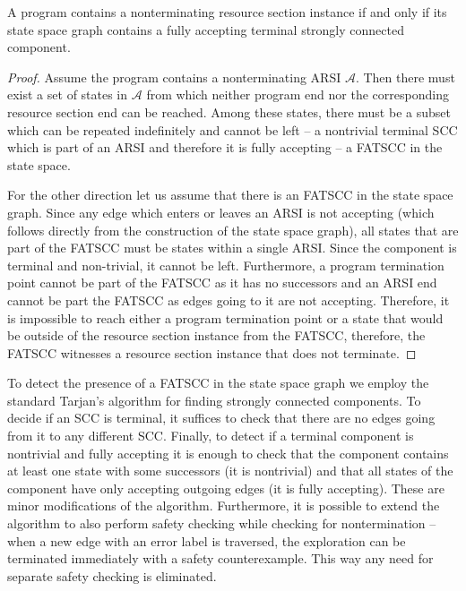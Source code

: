 \begin{theorem}\label{thm:lnterm}
    A program contains a nonterminating resource section instance if and only if
    its state space graph contains a fully accepting terminal strongly connected component.
\end{theorem}
\begin{proof}
    Assume the program contains a nonterminating ARSI $\mathcal{A}$.
    Then there must exist a set of states in $\mathcal{A}$ from which neither program end nor the corresponding resource section end can be reached.
    Among these states, there must be a subset which can be repeated
    indefinitely and cannot be left -- a nontrivial terminal SCC which is part
    of an ARSI and therefore it is fully accepting -- a FATSCC in the state space.

    For the other direction let us assume that there is an FATSCC in the state
    space graph. Since any edge which enters or leaves an ARSI is not accepting
    (which follows directly from the construction of the state space graph), all
    states that are part of the FATSCC must be states within a single
    ARSI. Since the component is terminal and non-trivial, it cannot be left.
    Furthermore, a program termination point cannot be part of the FATSCC as it
    has no successors and an ARSI end cannot be part the FATSCC as edges going to
    it are not accepting. Therefore, it is impossible to reach either a program
    termination point or a state that would be outside of the resource section
    instance from the FATSCC, therefore, the FATSCC witnesses a resource section
    instance that does not terminate.
\end{proof}

To detect the presence of a FATSCC in the state space graph we employ the
standard Tarjan's algorithm for finding strongly connected components.
To decide if an SCC is terminal, it suffices to check that there are no
edges going from it to any different SCC. Finally, to detect if a terminal
component is nontrivial and fully accepting it is enough to check that the
component contains at least one state with some successors (it is nontrivial) and
that all states of the component have only accepting outgoing edges (it is fully
accepting). These are minor modifications of the algorithm.
Furthermore, it is possible to extend the algorithm to also perform safety
checking while checking for nontermination -- when a new edge with an error label
is traversed, the exploration can be terminated immediately with a safety
counterexample.
This way any need for separate safety checking is eliminated.

